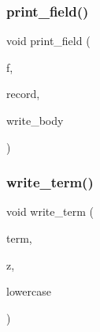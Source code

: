 \mbox{\label{irk-warc_8cpp_aeaa9afcbcca6c9cac8dfed13f3ec5b3d}} 
\subsubsection{\texorpdfstring{print\+\_\+field()}{print\_field()}}
{\footnotesize\ttfamily void print\+\_\+field (\begin{DoxyParamCaption}\item[{char}]{f,  }\item[{const \mbox{\hyperlink{classirkit_1_1io_1_1warc__record}{irkit\+::io\+::warc\+\_\+record}} \&}]{record,  }\item[{\mbox{\hyperlink{structbody__writer}{body\+\_\+writer}}}]{write\+\_\+body }\end{DoxyParamCaption})}

\mbox{\label{irk-warc_8cpp_a44adaf0886fa4ffc57f8ea4447218597}} 
\subsubsection{\texorpdfstring{write\+\_\+term()}{write\_term()}}
{\footnotesize\ttfamily void write\+\_\+term (\begin{DoxyParamCaption}\item[{std\+::string \&\&}]{term,  }\item[{\mbox{\hyperlink{structSN__env}{S\+N\+\_\+env}} $\ast$}]{z,  }\item[{bool}]{lowercase }\end{DoxyParamCaption})}

